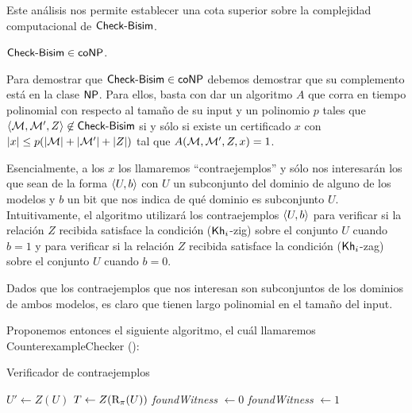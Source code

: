 Este análisis nos permite establecer una cota superior sobre la complejidad computacional de $\rm\textsf{Check-Bisim}$.

\begin{lema}\label{lema:cbisim-in-conp}
    $\rm\textsf{Check-Bisim} \in \rm\textsf{coNP}$. 
\end{lema}

\begin{demostracion}
    Para demostrar que $\rm\textsf{Check-Bisim} \in \rm\textsf{coNP}$ debemos demostrar que su complemento está en la clase $\rm\textsf{NP}$. Para ellos, basta con dar un 
    algoritmo $A$ que corra en tiempo polinomial con respecto al tamaño de su input y un polinomio $p$ tales que 
    $\langle \mathcal{M},\mathcal{M}',Z \rangle \not\in \rm\textsf{Check-Bisim}$ si y sólo si existe un certificado $x$ con $|x| \le p(|\mathcal{M}|+|\mathcal{M}'|+|Z|)$ 
    tal que $A(\mathcal{M},\mathcal{M}',Z,x) = 1$. 
    
    Esencialmente, a los $x$ los llamaremos ``contraejemplos'' y sólo nos interesarán los que sean de la forma $\langle U,b \rangle$ con $U$ un 
    subconjunto del dominio de alguno de los modelos y $b$ un bit que nos indica de qué dominio es subconjunto $U$. 
    Intuitivamente, el algoritmo utilizará los contraejemplos $\langle U,b \rangle$ para verificar si la relación $Z$ recibida 
    satisface la condición ($\mathsf{Kh}_i$-zig) sobre el conjunto $U$ cuando $b = 1$ y para verificar si la 
    relación $Z$ recibida satisface la condición ($\mathsf{Kh}_i$-zag) sobre el conjunto $U$ cuando $b = 0$.

    Dados que los contraejemplos que nos interesan son subconjuntos de los dominios de ambos modelos, es claro 
    que tienen largo polinomial en el tamaño del input.

    Proponemos entonces el siguiente algoritmo, el cuál llamaremos \textsf{CounterexampleChecker} ():

    \begin{algorithm}[t]
        \begin{footnotesize}
        \caption{Verificador de contraejemplos}
        \label{alg:counter-example-checker}
        \begin{algorithmic}[1]
                        \State $U' \gets Z(U)$
                        \State $T \gets Z(\mathrm{R}_\pi(U))$ 
                        \State \textit{foundWitness} $\gets 0$
                                    \State \textit{foundWitness} $\gets 1$
                                \EndIf         
                            \EndFor
                            \EndIf
                        \EndIf
                    \EndFor
                \EndFor
                \State {}
            \EndFunction


\end{algorithmic}
\end{footnotesize}
\end{algorithm}
\end{demostracion}

